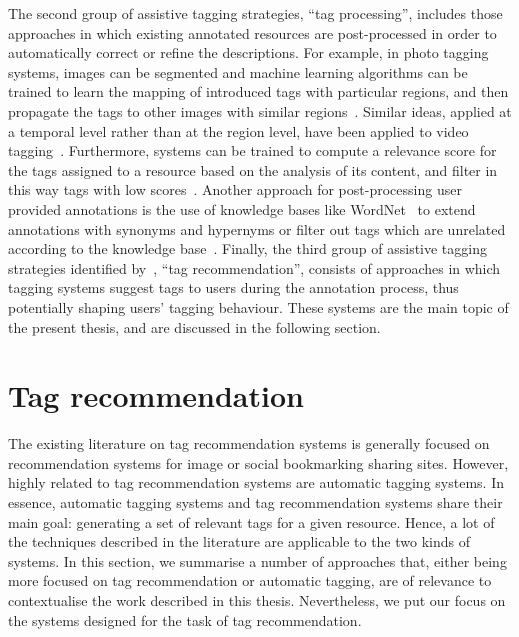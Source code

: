The second group of assistive tagging strategies, ``tag processing'', includes those approaches in which existing annotated resources are post-processed in order to automatically correct or refine the descriptions. For example, in photo tagging systems, images can be segmented and machine learning algorithms can be trained to learn the mapping of introduced tags with particular regions, and then propagate the tags to other images with similar regions~\citep{Liu2010b,Feng2010,Liu2011}. Similar ideas, applied at a temporal level rather than at the region level, have been applied to video tagging~\citep{Ulges2008}. Furthermore, systems can be trained to compute a relevance score for the tags assigned to a resource based on the analysis of its content, and filter in this way tags with low scores~\citep{Liu2009,Li2009,Chen2010a,Fan2010}.
Another approach for post-processing user provided annotations is the use of knowledge bases like WordNet~\citep{Miller1995} to extend annotations with synonyms and hypernyms or filter out tags which are unrelated according to the knowledge base~\citep{Liu2010a}. %
Finally, the third group of assistive tagging strategies identified by~\cite{Wang2012}, ``tag recommendation'', consists of approaches in which tagging systems suggest tags to users during the annotation process, thus potentially shaping users' tagging behaviour. These systems are the main topic of the present thesis, and are discussed in the following section.




\section{Tag recommendation}
\label{sec:soa:tag_recommendation}

The existing literature on tag recommendation systems is generally focused on recommendation systems for image or social bookmarking sharing sites.
However, highly related to tag recommendation systems are automatic tagging systems.
In essence, automatic tagging systems and tag recommendation systems share their main goal: generating a set of relevant tags for a given resource.
Hence, a lot of the techniques described in the literature are applicable to the two kinds of systems.
In this section, we summarise a number of approaches that, either being more focused on tag recommendation or automatic tagging, are of relevance to contextualise the work described in this thesis. Nevertheless, we put our focus on the systems designed for the task of tag recommendation.

